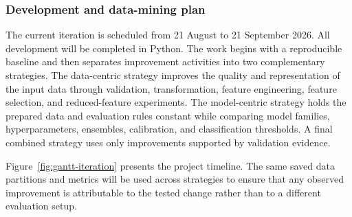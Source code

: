 \subsubsection{Development and data-mining plan}
The current iteration is scheduled from 21 August to 21 September 2026. All
development will be completed in Python. The work begins with a reproducible
baseline and then separates improvement activities into two complementary
strategies. The data-centric strategy improves the quality and representation
of the input data through validation, transformation, feature engineering,
feature selection, and reduced-feature experiments. The model-centric strategy
holds the prepared data and evaluation rules constant while comparing model
families, hyperparameters, ensembles, calibration, and classification
thresholds. A final combined strategy uses only improvements supported by
validation evidence.

Figure~\ref{fig:gantt-iteration} presents the project timeline. The same saved
data partitions and metrics will be used across strategies to ensure that any
observed improvement is attributable to the tested change rather than to a
different evaluation setup.


